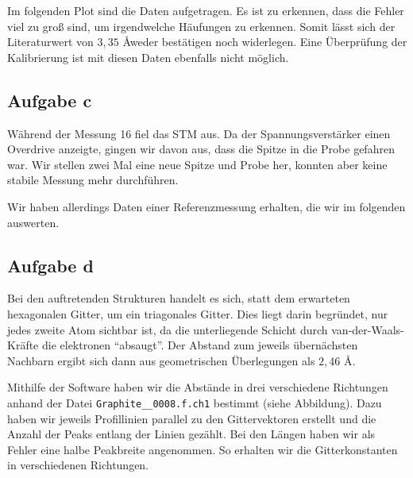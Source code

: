 \documentclass[a4paper,german,12pt,smallheadings]{scrartcl}
\begin{document}
Im folgenden Plot sind die Daten aufgetragen. Es ist zu erkennen, dass die
Fehler viel zu groß sind, um irgendwelche Häufungen zu erkennen. Somit lässt
sich der Literaturwert von $3{,}35$ \AA weder bestätigen noch widerlegen. Eine
Überprüfung der Kalibrierung ist mit diesen Daten ebenfalls nicht möglich.


\subsection{Aufgabe c}

Während der Messung 16 fiel das STM aus. Da der Spannungsverstärker einen
Overdrive anzeigte, gingen wir davon aus, dass die Spitze in die Probe gefahren
war. Wir stellen zwei Mal eine neue Spitze und Probe her, konnten aber keine
stabile Messung mehr durchführen.

Wir haben allerdings Daten einer Referenzmessung erhalten, die wir im folgenden
auswerten.

\subsection{Aufgabe d}
Bei den auftretenden Strukturen handelt es sich, statt dem erwarteten
hexagonalen Gitter, um ein triagonales Gitter. Dies liegt darin begründet, nur
jedes zweite Atom sichtbar ist, da die unterliegende Schicht durch
van-der-Waals-Kräfte die elektronen ``absaugt''. Der Abstand zum jeweils
übernächsten Nachbarn ergibt sich dann aus geometrischen Überlegungen als
$2{,}46$ \AA.

Mithilfe der Software haben wir die Abstände in drei verschiedene Richtungen
anhand der Datei \texttt{Graphite\_\_0008.f.ch1} bestimmt (siehe Abbildung).
Dazu haben wir jeweils Profillinien parallel zu den Gittervektoren erstellt und
die Anzahl der Peaks entlang der Linien gezählt.  Bei den Längen haben wir als
Fehler eine halbe Peakbreite angenommen. So erhalten wir die Gitterkonstanten
in verschiedenen Richtungen.
\end{document}
